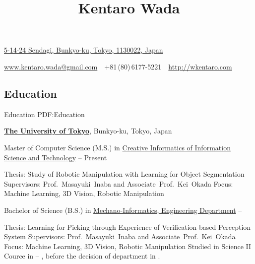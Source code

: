 \documentclass[letterpaper,MMMyyyy,nonstop]{simpleresumecv}
\newcommand{\CVAuthor}{Kentaro Wada}
\newcommand{\CVWebpage}{http://wkentaro.com}
\begin{document}

\title{\CVAuthor}

\begin{subtitle}
\href{https://www.google.co.jp/maps/place/5+Chome-14-24+Sendagi,+Bunky\%\%C5\%8D-ku,+T\%C5\%8Dky\%C5\%8D-to+113-0022/@35.7256436,139.7565051,17z/data=!3m1!4b1!4m5!3m4!1s0x60188dcec1ae4043:0x8a34261552288e81!8m2!3d35.7256436!4d139.7586938?hl=en}
{5-14-24 Sendagi, Bunkyo-ku, Tokyo, 1130022, Japan}
\par
\href{mailto:www.kentaro.wada@gmail.com}
{www.kentaro.wada@gmail.com}
\,\SubBulletSymbol\,
+81\,(80)\,6177-5221
\,\SubBulletSymbol\,
\href{\CVWebpage}
{\CVWebpage}
\end{subtitle}

\begin{body}


\section
{Education}
{Education}
{PDF:Education}

\href{http://www.u-tokyo.ac.jp/en/index.html}
{\textbf{The University of Tokyo}},
Bunkyo-ku, Tokyo, Japan

\GapNoBreak
\BulletItem
Master of Computer Science (M.S.) in
\href{http://www.i.u-tokyo.ac.jp/edu/course/ci/aim_e.shtml}
{Creative Informatics of Information Science and Technology}
\hfill
{} --
Present
\begin{detail}
\SubBulletItem
Thesis:
Study of Robotic Manipulation with Learning for Object Segmentation
\SubBulletItem
Supervisors:
Prof.~Masayuki~Inaba and Associate~Prof.~Kei~Okada
\SubBulletItem
Focus:
Machine Learning, 3D Vision, Robotic Manipulation
\end{detail}

\GapNoBreak
\BulletItem
Bachelor of Science (B.S.) in
\href{http://www.kikaib.t.u-tokyo.ac.jp}
{Mechano-Informatics, Engineering Department}
\hfill
{} --
\begin{detail}
\SubBulletItem
Thesis:
Learning for Picking through Experience of Verification-based Perception System
\SubBulletItem
Supervisors:
Prof.~Masayuki~Inaba and Associate~Prof.~Kei~Okada
\SubBulletItem
Focus:
Machine Learning, 3D Vision, Robotic Manipulation
\SubBulletItem
Studied in Science II Cource in  -- ,
before the decision of department in .
\end{detail}


\end{body}
\end{document}
